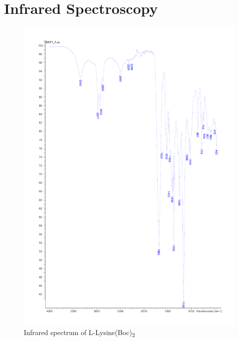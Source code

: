 
\chapter{Infrared Spectroscopy} %

\label{AppendixC} %

\begin{figure}[ht!]
\centering
\includegraphics[scale=0.6]{IR/KAT1_1.pdf}
\caption{Infrared spectrum of L-Lysine(Boc)\textsubscript{2}}
\end{figure}

